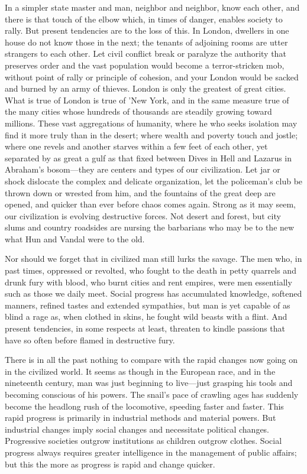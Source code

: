 \documentclass{book}
\begin{document}
In a simpler state master and man, neighbor and neighbor, know each other, and there is that touch of the elbow which, in times of danger, enables society to rally. But present tendencies are to the loss of this. In London, dwellers in one house do not know those in the next; the tenants of adjoining rooms are utter strangers to each other. Let civil conflict break or paralyze the authority that preserves order and the vast population would become a terror-stricken mob, without point of rally or principle of cohesion, and your London would be sacked and burned by an army of thieves. London is only the greatest of great cities. What is true of London is true of ’New York, and in the same measure true of the many cities whose hundreds of thousands are steadily growing toward millions. These vast aggregations of humanity, where he who seeks isolation may find it more truly than in the desert; where wealth and poverty touch and jostle; where one revels and another starves within a few feet of each other, yet separated by as great a gulf as that fixed between Dives in Hell and Lazarus in Abraham’s bosom—they are centers and types of our civilization. Let jar or shock dislocate the complex and delicate organization, let the policeman’s club be thrown down or wrested from him, and the fountains of the great deep are opened, and quicker than ever before chaos comes again. Strong as it may seem, our civilization is evolving destructive forces. Not desert and forest, but city slums and country roadsides are nursing the barbarians who may be to the new what Hun and Vandal were to the old.

Nor should we forget that in civilized man still lurks the savage. The men who, in past times, oppressed or revolted, who fought to the death in petty quarrels and drunk fury with blood, who burnt cities and rent empires, were men essentially such as those we daily meet. Social progress has accumulated knowledge, softened manners, refined tastes and extended sympathies, but man is yet capable of as blind a rage as, when clothed in skins, he fought wild beasts with a flint. And present tendencies, in some respects at least, threaten to kindle passions that have so often before flamed in destructive fury.

There is in all the past nothing to compare with the rapid changes now going on in the civilized world. It seems as though in the European race, and in the nineteenth century, man was just beginning to live—just grasping his tools and becoming conscious of his powers. The snail’s pace of crawling ages has suddenly become the headlong rush of the locomotive, speeding faster and faster. This rapid progress is primarily in industrial methods and material powers. But industrial changes imply social changes and necessitate political changes. Progressive societies outgrow institutions as children outgrow clothes. Social progress always requires greater intelligence in the management of public affairs; but this the more as progress is rapid and change quicker.
\end{document}

